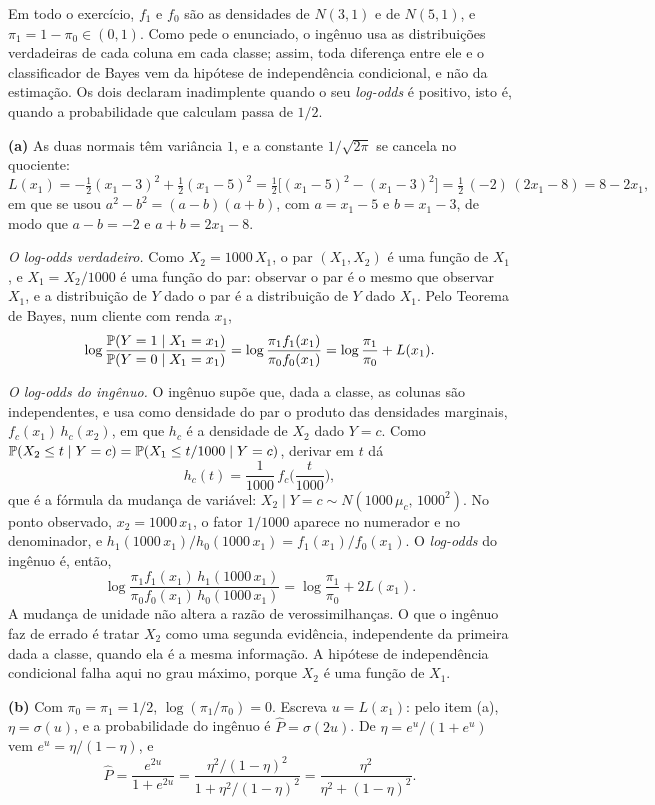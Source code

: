 \begin{solucao}
Em todo o exercício, $f_1$ e $f_0$ são as densidades de $N(3,1)$ e de $N(5,1)$, e
$\pi_1=1-\pi_0\in(0,1)$. Como pede o enunciado, o ingênuo usa as distribuições verdadeiras de
cada coluna em cada classe; assim, toda diferença entre ele e o classificador de Bayes vem da
hipótese de independência condicional, e não da estimação. Os dois declaram inadimplente
quando o seu \emph{log-odds} é positivo, isto é, quando a probabilidade que calculam passa de
$1/2$.

\smallskip
\textbf{(a)} As duas normais têm variância $1$, e a constante $1/\sqrt{2\pi}$ se cancela no
quociente:
\[
  L(x_1)=-\tfrac12(x_1-3)^2+\tfrac12(x_1-5)^2
        =\tfrac12\big[(x_1-5)^2-(x_1-3)^2\big]
        =\tfrac12\,(-2)\,(2x_1-8)=8-2x_1 ,
\]
em que se usou $a^2-b^2=(a-b)(a+b)$, com $a=x_1-5$ e $b=x_1-3$, de modo que $a-b=-2$ e
$a+b=2x_1-8$.

\emph{O log-odds verdadeiro.} Como $X_2=1000\,X_1$, o par $(X_1,X_2)$ é uma função de $X_1$, e
$X_1=X_2/1000$ é uma função do par: observar o par é o mesmo que observar $X_1$, e a
distribuição de $Y$ dado o par é a distribuição de $Y$ dado $X_1$. Pelo Teorema de Bayes, num
cliente com renda $x_1$,
\[
  \log\frac{\mathbb{P}(Y=1\mid X_1=x_1)}{\mathbb{P}(Y=0\mid X_1=x_1)}
  =\log\frac{\pi_1f_1(x_1)}{\pi_0f_0(x_1)}=\log\frac{\pi_1}{\pi_0}+L(x_1).
\]

\emph{O log-odds do ingênuo.} O ingênuo supõe que, dada a classe, as colunas são
independentes, e usa como densidade do par o produto das densidades marginais,
$f_c(x_1)\,h_c(x_2)$, em que $h_c$ é a densidade de $X_2$ dado $Y=c$. Como
$\mathbb{P}(X_2\le t\mid Y=c)=\mathbb{P}(X_1\le t/1000\mid Y=c)$, derivar em $t$ dá
\[
  h_c(t)=\frac1{1000}\,f_c\Big(\frac t{1000}\Big),
\]
que é a fórmula da mudança de variável: $X_2\mid Y=c\sim N(1000\,\mu_c,\,1000^2)$. No ponto
observado, $x_2=1000\,x_1$, o fator $1/1000$ aparece no numerador e no denominador, e
$h_1(1000\,x_1)/h_0(1000\,x_1)=f_1(x_1)/f_0(x_1)$. O \emph{log-odds} do ingênuo é, então,
\[
  \log\frac{\pi_1f_1(x_1)\,h_1(1000\,x_1)}{\pi_0f_0(x_1)\,h_0(1000\,x_1)}
  =\log\frac{\pi_1}{\pi_0}+2L(x_1).
\]
A mudança de unidade não altera a razão de verossimilhanças. O que o ingênuo faz de errado é
tratar $X_2$ como uma segunda evidência, independente da primeira dada a classe, quando ela é a
mesma informação. A hipótese de independência condicional falha aqui no grau máximo, porque
$X_2$ é uma função de $X_1$.

\smallskip
\textbf{(b)} Com $\pi_0=\pi_1=1/2$, $\log(\pi_1/\pi_0)=0$. Escreva $u=L(x_1)$: pelo item (a),
$\eta=\sigma(u)$, e a probabilidade do ingênuo é $\widehat P=\sigma(2u)$. De
$\eta=e^u/(1+e^u)$ vem $e^u=\eta/(1-\eta)$, e
\[
  \widehat P=\frac{e^{2u}}{1+e^{2u}}
  =\frac{\eta^2/(1-\eta)^2}{1+\eta^2/(1-\eta)^2}
  =\frac{\eta^2}{\eta^2+(1-\eta)^2}.
\]


\end{solucao}

